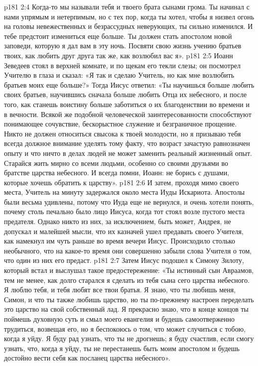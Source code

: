\vs p181 2:4 Когда\hyp{}то мы называли тебя и твоего брата сынами грома. Ты начинал с нами упрямым и нетерпимым, но с тех пор, когда ты хотел, чтобы я низвел огонь на головы невежественных и безрассудных неверующих, ты сильно изменился. И тебе предстоит измениться еще больше. Ты должен стать апостолом новой заповеди, которую я дал вам в эту ночь. Посвяти свою жизнь учению братьев твоих, как любить друг друга так же, как возлюбил вас я».
\vs p181 2:5 Иоанн Зеведеев стоял в верхней комнате, и по щекам его текли слезы; он посмотрел Учителю в глаза и сказал: «Я так и сделаю Учитель, но как мне возлюбить братьев моих еще больше?» Тогда Иисус ответил: «Ты научишься больше любить своих братьев, научившись сначала больше любить Отца их небесного, и после того, как станешь воистину больше заботиться о их благоденствии во времени и в вечности. Всякой же подобной человеческой заинтересованности способствуют понимающее сочувствие, бескорыстное служение и безграничное прощение. Никто не должен относиться свысока к твоей молодости, но я призываю тебя всегда должное внимание уделять тому факту, что возраст зачастую равнозначен опыту и что ничто в делах людей не может заменить реальный жизненный опыт. Старайся жить мирно со всеми людьми, особенно со своими друзьями во братстве царства небесного. И всегда помни, Иоанн: не борись с душами, которые хочешь обратить к царству».
\vs p181 2:6 \pc И затем, проходя мимо своего места, Учитель на минуту задержался около места Иуды Искариота. Апостолы были весьма удивлены, потому что Иуда еще не вернулся, и очень хотели понять, почему столь печально было лицо Иисуса, когда тот стоял возле пустого места предателя. Однако никто из них, за исключением, быть может, Андрея, не допускал и малейшей мысли, что их казначей ушел предавать своего Учителя, как намекнул им чуть раньше во время вечери Иисус. Происходило столько необычного, что на какое\hyp{}то время они совершенно забыли слова Учителя о том, что один из них его предаст.
\vs p181 2:7 \pc Затем Иисус подошел к Симону Зилоту, который встал и выслушал такое предостережение: «Ты истинный сын Авраамов, тем не менее, как долго старался я сделать из тебя сына сего царства небесного. Я люблю тебя, и тебя любят все твои братья. Я знаю, что ты любишь меня, Симон, и что ты также любишь царство, но ты по\hyp{}прежнему настроен переделать это царство на свой собственный лад. Я прекрасно знаю, что в конце концов ты поймешь духовную суть и смыл моего евангелия и будешь самоотверженно трудиться, возвещая его, но я беспокоюсь о том, что может случиться с тобою, когда я уйду. Я буду рад узнать, что ты не дрогнешь; я буду счастлив, если смогу узнать, что, когда я уйду, ты не перестанешь быть моим апостолом и будешь достойно вести себя как посланец царства небесного».
